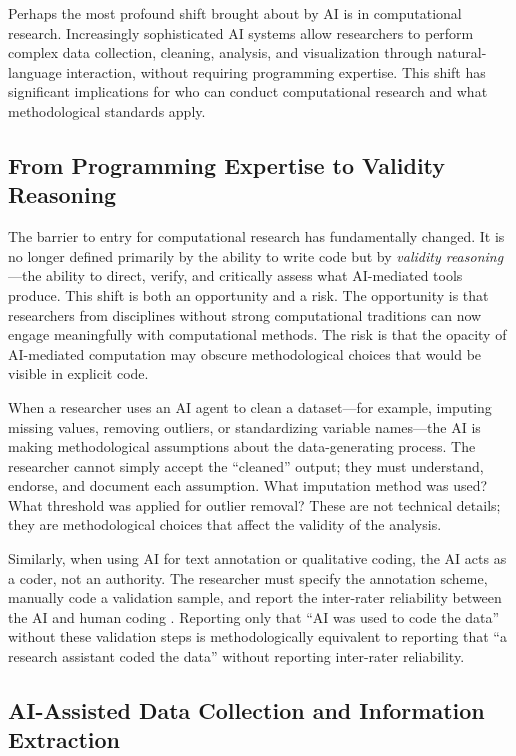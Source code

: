 \documentclass[12pt, a4paper]{article}
\begin{document}
Perhaps the most profound shift brought about by AI is in computational research. Increasingly sophisticated AI systems allow researchers to perform complex data collection, cleaning, analysis, and visualization through natural-language interaction, without requiring programming expertise. This shift has significant implications for who can conduct computational research and what methodological standards apply.

\subsection{From Programming Expertise to Validity Reasoning}

The barrier to entry for computational research has fundamentally changed. It is no longer defined primarily by the ability to write code but by \textit{validity reasoning}---the ability to direct, verify, and critically assess what AI-mediated tools produce. This shift is both an opportunity and a risk. The opportunity is that researchers from disciplines without strong computational traditions can now engage meaningfully with computational methods. The risk is that the opacity of AI-mediated computation may obscure methodological choices that would be visible in explicit code.

When a researcher uses an AI agent to clean a dataset---for example, imputing missing values, removing outliers, or standardizing variable names---the AI is making methodological assumptions about the data-generating process. The researcher cannot simply accept the ``cleaned'' output; they must understand, endorse, and document each assumption. What imputation method was used? What threshold was applied for outlier removal? These are not technical details; they are methodological choices that affect the validity of the analysis.

Similarly, when using AI for text annotation or qualitative coding, the AI acts as a coder, not an authority. The researcher must specify the annotation scheme, manually code a validation sample, and report the inter-rater reliability between the AI and human coding \citep{grimmer2022text}. Reporting only that ``AI was used to code the data'' without these validation steps is methodologically equivalent to reporting that ``a research assistant coded the data'' without reporting inter-rater reliability.

\subsection{AI-Assisted Data Collection and Information Extraction}
\end{document}
